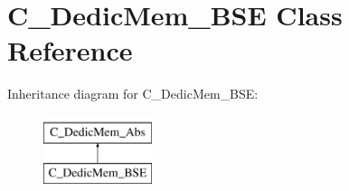 \hypertarget{class_c___dedic_mem___b_s_e}{\section{C\-\_\-\-Dedic\-Mem\-\_\-\-B\-S\-E Class Reference}
\label{class_c___dedic_mem___b_s_e}
}
Inheritance diagram for C\-\_\-\-Dedic\-Mem\-\_\-\-B\-S\-E\-:\begin{figure}[H]
\begin{center}
\leavevmode
\includegraphics[height=2.000000cm]{class_c___dedic_mem___b_s_e}
\end{center}
\end{figure}
